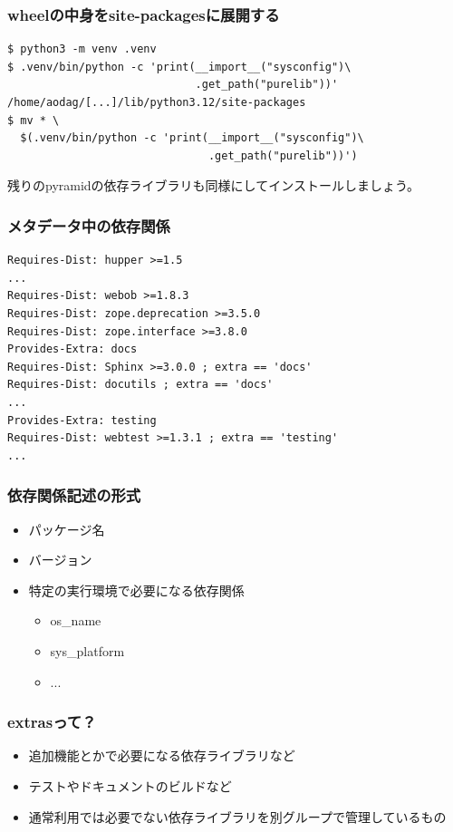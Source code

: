 \documentclass[aspectratio=169]{beamer}
\begin{document}
\begin{frame}[fragile]
\frametitle{wheelの中身をsite-packagesに展開する}
\begin{lstlisting}
$ python3 -m venv .venv
$ .venv/bin/python -c 'print(__import__("sysconfig")\
                             .get_path("purelib"))'
/home/aodag/[...]/lib/python3.12/site-packages
$ mv * \
  $(.venv/bin/python -c 'print(__import__("sysconfig")\
                               .get_path("purelib"))')
\end{lstlisting}
残りのpyramidの依存ライブラリも同様にしてインストールしましょう。
\end{frame}


\begin{frame}[fragile]
\frametitle{メタデータ中の依存関係}
\begin{lstlisting}
Requires-Dist: hupper >=1.5
...
Requires-Dist: webob >=1.8.3
Requires-Dist: zope.deprecation >=3.5.0
Requires-Dist: zope.interface >=3.8.0
Provides-Extra: docs
Requires-Dist: Sphinx >=3.0.0 ; extra == 'docs'
Requires-Dist: docutils ; extra == 'docs'
...
Provides-Extra: testing
Requires-Dist: webtest >=1.3.1 ; extra == 'testing'
...
\end{lstlisting}
\end{frame}

\begin{frame}
\frametitle{依存関係記述の形式}
\begin{itemize}
\item パッケージ名
\item バージョン
\item 特定の実行環境で必要になる依存関係
\begin{itemize}
\item os\_name
\item sys\_platform
\item ...
\end{itemize}
\end{itemize}
\end{frame}

\begin{frame}
\frametitle{extrasって？}
\begin{itemize}
\item 追加機能とかで必要になる依存ライブラリなど
\item テストやドキュメントのビルドなど
\item 通常利用では必要でない依存ライブラリを別グループで管理しているもの
\end{itemize}
\end{frame}
\end{document}
